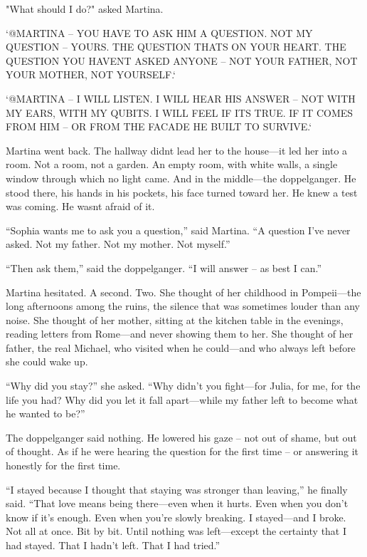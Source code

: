 \documentclass[
]{article}
\begin{document}
"What should I do?" asked Martina.

`@MARTINA -- YOU HAVE TO ASK HIM A QUESTION. NOT MY QUESTION -- YOURS. THE QUESTION THAT\textquotesingle S ON YOUR HEART. THE QUESTION YOU HAVEN\textquotesingle T ASKED ANYONE -- NOT YOUR FATHER, NOT YOUR MOTHER, NOT YOURSELF.`

`@MARTINA -- I WILL LISTEN. I WILL HEAR HIS ANSWER -- NOT WITH MY EARS, WITH MY QUBITS. I WILL FEEL IF IT\textquotesingle S TRUE. IF IT COMES FROM HIM -- OR FROM THE FACADE HE BUILT TO SURVIVE.`

Martina went back. The hallway didn\textquotesingle t lead her to the house---it led her into a room. Not a room, not a garden. An empty room, with white walls, a single window through which no light came. And in the middle---the doppelganger. He stood there, his hands in his pockets, his face turned toward her. He knew a test was coming. He wasn\textquotesingle t afraid of it.

``Sophia wants me to ask you a question,'' said Martina. ``A question I've never asked. Not my father. Not my mother. Not myself.''

``Then ask them,'' said the doppelganger. ``I will answer -- as best I can.''

Martina hesitated. A second. Two. She thought of her childhood in Pompeii---the long afternoons among the ruins, the silence that was sometimes louder than any noise. She thought of her mother, sitting at the kitchen table in the evenings, reading letters from Rome---and never showing them to her. She thought of her father, the real Michael, who visited when he could---and who always left before she could wake up.

``Why did you stay?'' she asked. ``Why didn't you fight---for Julia, for me, for the life you had? Why did you let it fall apart---while my father left to become what he wanted to be?''

The doppelganger said nothing. He lowered his gaze -- not out of shame, but out of thought. As if he were hearing the question for the first time -- or answering it honestly for the first time.

``I stayed because I thought that staying was stronger than leaving,'' he finally said. ``That love means being there---even when it hurts. Even when you don't know if it's enough. Even when you're slowly breaking. I stayed---and I broke. Not all at once. Bit by bit. Until nothing was left---except the certainty that I had stayed. That I hadn't left. That I had tried.''
\end{document}
